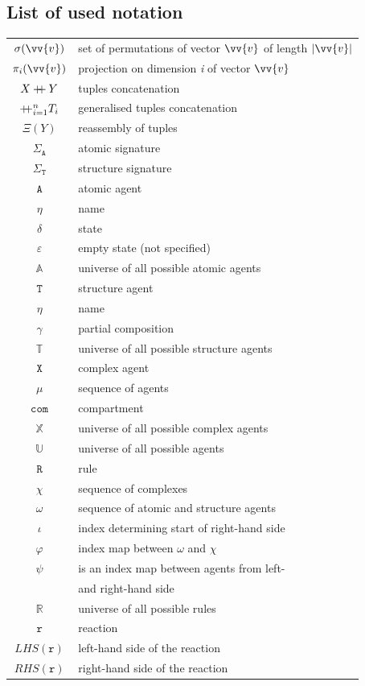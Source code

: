 \documentclass[12pt, twoside]{fithesis2} %
\newcommand\mdoubleplus{\mathbin{+\mkern-7mu+}}
\begin{document}
\begin{appendices}

\chapter{List of used notation}

\begin{center}
\begin{tabular}{c | l}
$\sigma(\vv{v})$ & set of permutations of vector $\vv{v}$ of length $|\vv{v}|$\\
$\pi_i(\vv{v})$ & projection on dimension \emph{i} of vector $\vv{v}$\\
$X \mdoubleplus Y$ & tuples concatenation\\
$\mdoubleplus_{i=1}^n T_i$ & generalised tuples concatenation\\
$\Xi(Y)$ & reassembly of tuples\\
\hline 
$\Sigma_{\mathtt{A}}$ & atomic signature \\
$\Sigma_{\mathtt{T}}$ & structure signature \\
\hline 
$\mathtt{A}$ & atomic agent \\
$\eta$ & name \\
$\delta$ & state \\
$\varepsilon$ & empty state (not specified)\\
$\mathds{A}$ & universe of all possible atomic agents \\
\hline 
$\mathtt{T}$ & structure agent \\
$\eta$ & name \\
$\gamma$ & partial composition\\
$\mathds{T}$ & universe of all possible structure agents\\
\hline 
$\mathtt{X}$ & complex agent\\
$\mu$ & sequence of agents\\
$\mathtt{com}$ & compartment\\
$\mathds{X}$ & universe of all possible complex agents\\
$\mathds{U}$ & universe of all possible agents\\
\hline 
$\mathtt{R}$ & rule\\
$\chi$ & sequence of complexes\\
$\omega$ & sequence of atomic and structure agents\\
$\iota$ & index determining start of right-hand side\\
$\varphi$ & index map between $\omega$ and $\chi$\\
$\psi$ & is an index map between agents from left-\\
 & and right-hand side\\
$\mathds{R}$ & universe of all possible rules\\
\hline 
$\mathtt{r}$ & reaction\\
$LHS(\mathtt{r})$ & left-hand side of the reaction\\
$RHS(\mathtt{r})$ & right-hand side of the reaction\\
\end{tabular}
\end{center}


\end{appendices}
\end{document}
